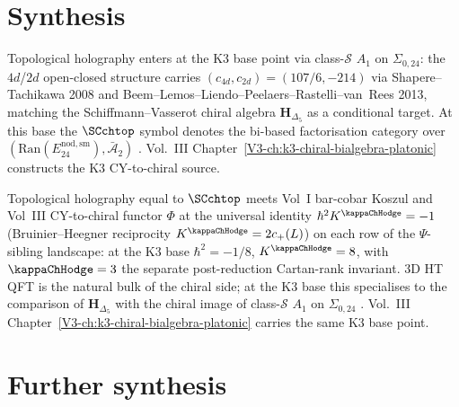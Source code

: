 \section{Synthesis}
\label{sec:v2-preface-supplement}

\begin{remark}
\label{rem:v2-preface-1}
Topological holography enters at the K3 base point via
class-$\mathcal S$ $A_1$ on $\Sigma_{0,24}$: the $4d$/$2d$
open-closed structure carries
$(c_{4d}, c_{2d}) = (107/6, -214)$ via Shapere--Tachikawa
2008 and Beem--Lemos--Liendo--Peelaers--Rastelli--van~Rees
2013, matching the Schiffmann--Vasserot chiral algebra
$\mathbf H_{\Delta_5}$ as a conditional target. At this base the
$\SCchtop$ symbol
denotes the bi-based factorisation category over
$(\mathrm{Ran}(E^{\mathrm{nod,sm}}_{24}),\bar{\mathcal A}_2)$
\cite{Gaiotto2009,BeemRastelli2015}. Vol.~III
Chapter~\ref{V3-ch:k3-chiral-bialgebra-platonic} constructs the
K3 CY-to-chiral source.
\end{remark}

\begin{remark}
\label{rem:v2-preface-2}
Topological holography equal to $\SCchtop$ meets Vol~I bar-cobar
Koszul and Vol~III CY-to-chiral functor $\Phi$ at the universal
identity
$\hbar^2 K^{\kappaChHodge} = -1$ (Bruinier--Heegner
reciprocity $K^{\kappaChHodge} = 2c_+(L)$)
on each row of the $\Psi$-sibling landscape: at the K3 base
$\hbar^2 = -1/8$, $K^{\kappaChHodge} = 8$, with
$\kappaChHodge = 3$ the separate post-reduction Cartan-rank
invariant. $3$D HT QFT is the
natural bulk of
the chiral side; at the K3 base this specialises to the
comparison of $\mathbf H_{\Delta_5}$ with the chiral image
of class-$\mathcal S$ $A_1$ on $\Sigma_{0,24}$
\cite{EtingofKazhdan2007PartV,Lusztig1990}. Vol.~III
Chapter~\ref{V3-ch:k3-chiral-bialgebra-platonic} carries the same
K3 base point.
\end{remark}

\section{Further synthesis}
\label{sec:v2-preface-supplement-ii}

